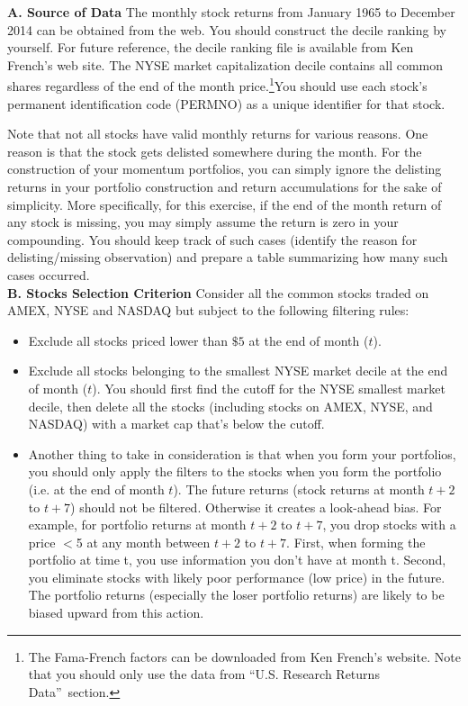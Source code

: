 \textbf{A. Source of Data}
The monthly stock returns from January 1965 to December 2014 can be obtained from the web. You should construct the decile ranking by yourself. For future reference, the decile ranking file is available from Ken French's web site. The NYSE market capitalization decile contains all common shares regardless of the end of the month price.\footnote{The Fama-French factors can be downloaded from Ken French's website. Note that you should only use the data from \textquotedblleft U.S. Research Returns Data\textquotedblright\ section.}You should use each stock's permanent identification code (PERMNO) as a unique identifier for that stock.

Note that not all stocks have valid monthly returns for various reasons. One reason is that the stock gets delisted somewhere during the month. For the construction of your momentum portfolios, you can simply ignore the delisting returns in your portfolio construction and return accumulations for the sake of simplicity. More specifically, for this exercise, if the end of the month return of any stock is missing, you may simply assume the return is zero in your compounding. You should keep track of such cases (identify the reason for delisting/missing observation) and prepare a table summarizing how many such cases occurred. \\

\textbf{B. Stocks Selection Criterion}
Consider all the common stocks traded on AMEX, NYSE and NASDAQ but
subject to the following filtering rules:
	\begin{itemize}
	\item Exclude all stocks priced lower than $\$5$ at the end of month ($t$).
	\item Exclude all stocks belonging to the smallest NYSE market decile at the end of month ($t$). You should first find the cutoff for the NYSE smallest market decile, then delete all the stocks (including stocks on AMEX, NYSE, and NASDAQ) with a market cap that's below the cutoff.
	\item Another thing to take in consideration is that when you form your portfolios, you should only apply the filters to the stocks when you form the portfolio (i.e. at the end of month $t$). The future returns (stock returns at month $t+2$ to $t+7$) should not be filtered. Otherwise it creates a look-ahead bias. For example, for portfolio returns at month $t+2$ to $t+7$, you drop stocks with a price $<$5 at any month between $t+2$ to $t+7$. First, when forming the portfolio at time t, you use information you don't have at month t. Second, you eliminate stocks with likely poor performance (low price) in the future. The portfolio returns (especially the loser portfolio returns) are likely to be biased upward from this action. \\
\end{itemize}


